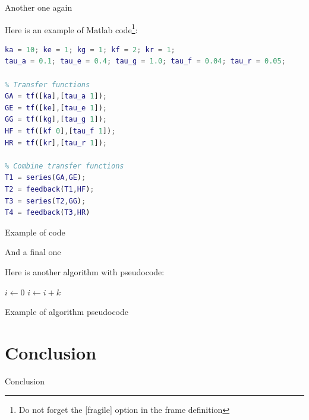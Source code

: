 \documentclass[9pt]{beamer}
\begin{document}

\begin{frame}[fragile]{Another one again}

Here is an example of Matlab code\footnote{Do not forget the [fragile] option in the frame definition}:
\begin{algorithm}[H]
\begin{lstlisting}[language=Matlab]
% Variables
ka = 10; ke = 1; kg = 1; kf = 2; kr = 1;
tau_a = 0.1; tau_e = 0.4; tau_g = 1.0; tau_f = 0.04; tau_r = 0.05;

% Transfer functions
GA = tf([ka],[tau_a 1]);
GE = tf([ke],[tau_e 1]);
GG = tf([kg],[tau_g 1]);
HF = tf([kf 0],[tau_f 1]);
HR = tf([kr],[tau_r 1]);

% Combine transfer functions
T1 = series(GA,GE);
T2 = feedback(T1,HF);
T3 = series(T2,GG);
T4 = feedback(T3,HR)
\end{lstlisting}
\caption{Example of code}
\label{alg:code}
\end{algorithm}

\end{frame}


\begin{frame}[fragile]{And a final one}

Here is another algorithm with pseudocode:
\begin{algorithm}[H]
\begin{algorithmic}[1] %
\vspace*{0.2em}
    \State $i\gets 0$
\Else
        \State $i\gets i+k$ 
    \EndIf
\EndIf
\end{algorithmic}
\caption{Example of algorithm pseudocode}
\label{alg:algo}
\end{algorithm}


\end{frame}


\section{Conclusion}


\begin{frame}{Conclusion}

\lipsum[1-1]

\end{frame}
\end{document}
